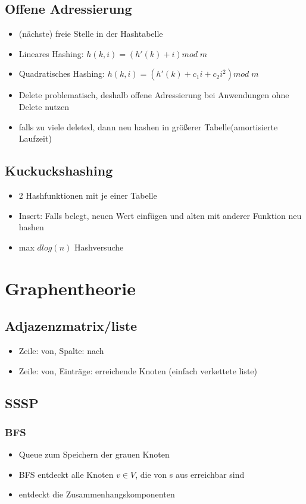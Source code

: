 \documentclass{article}
\begin{document}
\subsection{Offene Adressierung}
\begin{itemize}
\item (n{\"a}chste) freie Stelle in der Hashtabelle
\item Lineares Hashing: $h(k,i) = (h'(k) +i) mod \; m$
\item Quadratisches Hashing: $h(k,i) = (h'(k) +c_1i+ c_2 i^2) mod \; m$
\item Delete problematisch, deshalb offene Adressierung bei Anwendungen ohne Delete nutzen
\item falls zu viele deleted, dann neu hashen in gr{\"o}\ss erer Tabelle(amortisierte Laufzeit)
\end{itemize}

\subsection{Kuckuckshashing}
\begin{itemize}
\item 2 Hashfunktionen mit je einer Tabelle
\item Insert: Falls belegt, neuen Wert einf{\"u}gen und alten mit anderer Funktion neu hashen
\item max $d log(n)$ Hashversuche
\end{itemize}


\section{Graphentheorie}
\subsection{Adjazenzmatrix/liste}
\begin{itemize}
\item Zeile: von, Spalte: nach
\item Zeile: von, Eintr{\"a}ge: erreichende Knoten (einfach verkettete liste)
\end{itemize}

\subsection{SSSP}
\subsubsection{BFS}
\begin{itemize}

\item Queue zum Speichern der grauen Knoten
\item BFS entdeckt alle Knoten $v\in V$, die von s aus erreichbar sind
\item entdeckt die Zusammenhangskomponenten
\end{itemize}
\end{document}
